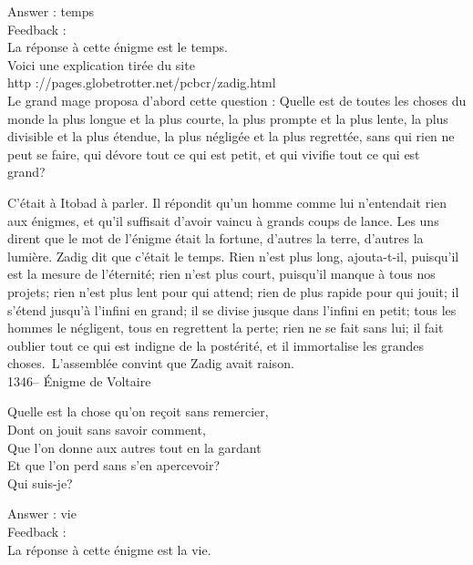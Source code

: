 \documentclass[letterpaper, 12pt]{article}
\begin{document}
Answer : temps\\

Feedback : \\
La r\'eponse \`a cette \'enigme est le temps.  \\
Voici une explication tir\'ee du site\\
http ://pages.globetrotter.net/pcbcr/zadig.html\\

Le grand mage proposa d'abord cette question : \og Quelle est de
toutes les choses du monde la plus longue et la plus courte, la plus
prompte et la plus lente, la plus divisible et la plus \'etendue, la
plus n\'eglig\'ee et la plus regrett\'ee, sans qui rien ne peut se
faire, qui d\'evore tout ce qui est petit, et qui vivifie tout ce
qui est grand?\fg\

C'\'etait \`a Itobad \`a parler. Il r\'epondit qu'un homme comme lui
n'entendait rien aux \'enigmes, et qu'il suffisait d'avoir vaincu
\`a grands coups de lance. Les uns dirent que le mot de l'\'enigme
\'etait la fortune, d'autres la terre, d'autres la lumi\`ere. Zadig
dit que c'\'etait le temps. \og Rien n'est plus long, ajouta-t-il,
puisqu'il est la mesure de l'\'eternit\'e; rien n'est plus court,
puisqu'il manque \`a tous nos projets; rien n'est plus lent pour qui
attend; rien de plus rapide pour qui jouit; il s'\'etend jusqu'\`a
l'infini en grand; il se divise jusque dans l'infini en petit; tous
les hommes le n\'egligent, tous en regrettent la perte; rien ne se
fait sans lui; il fait oublier tout ce qui est indigne de la
post\'erit\'e, et il immortalise les grandes choses.\fg\
L'assembl\'ee convint que Zadig avait raison.\\


1346-- \'Enigme de Voltaire\\
\begin{center}{Quelle est la chose qu'on re\c coit sans remercier, \\
Dont on jouit sans savoir comment,\\
Que l'on donne aux autres tout en la gardant\\
Et que l'on perd sans s'en apercevoir?\\
Qui suis-je?\\}
\end{center}

Answer : vie\\

Feedback : \\
La r\'eponse \`a cette \'enigme est la vie.\\
\end{document}
